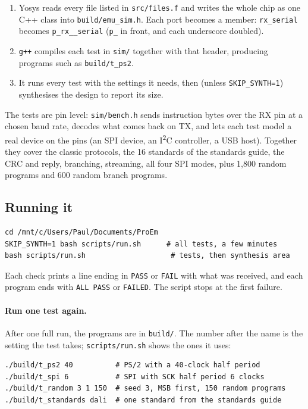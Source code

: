 \documentclass[11pt,a4paper]{article}
\newcommand{\file}[1]{\texttt{#1}}
\begin{document}
\begin{enumerate}
\item Yosys reads every file listed in \file{src/files.f} and writes the whole chip as one C++ class into \file{build/emu\_sim.h}. Each port becomes a member: \texttt{rx\_serial} becomes \texttt{p\_rx\_\_serial} (\texttt{p\_} in front, and each underscore doubled).
\item \texttt{g++} compiles each test in \file{sim/} together with that header, producing programs such as \file{build/t\_ps2}.
\item It runs every test with the settings it needs, then (unless \texttt{SKIP\_SYNTH=1}) synthesises the design to report its size.
\end{enumerate}

The tests are pin level: \file{sim/bench.h} sends instruction bytes over the RX pin at a chosen baud rate, decodes what comes back on TX, and lets each test model a real device on the pins (an SPI device, an I\textsuperscript{2}C controller, a USB host). Together they cover the classic protocols, the 16 standards of the standards guide, the CRC and reply, branching, streaming, all four SPI modes, plus 1,800 random programs and 600 random branch programs.

\subsection{Running it}

\begin{lstlisting}
cd /mnt/c/Users/Paul/Documents/ProEm
SKIP_SYNTH=1 bash scripts/run.sh      # all tests, a few minutes
bash scripts/run.sh                    # tests, then synthesis area
\end{lstlisting}
Each check prints a line ending in \texttt{PASS} or \texttt{FAIL} with what was received, and each program ends with \texttt{ALL PASS} or \texttt{FAILED}. The script stops at the first failure.

\paragraph{Run one test again.} After one full run, the programs are in \file{build/}. The number after the name is the setting the test takes; \file{scripts/run.sh} shows the ones it uses:
\begin{lstlisting}
./build/t_ps2 40          # PS/2 with a 40-clock half period
./build/t_spi 6           # SPI with SCK half period 6 clocks
./build/t_random 3 1 150  # seed 3, MSB first, 150 random programs
./build/t_standards dali  # one standard from the standards guide
\end{lstlisting}
\end{document}
